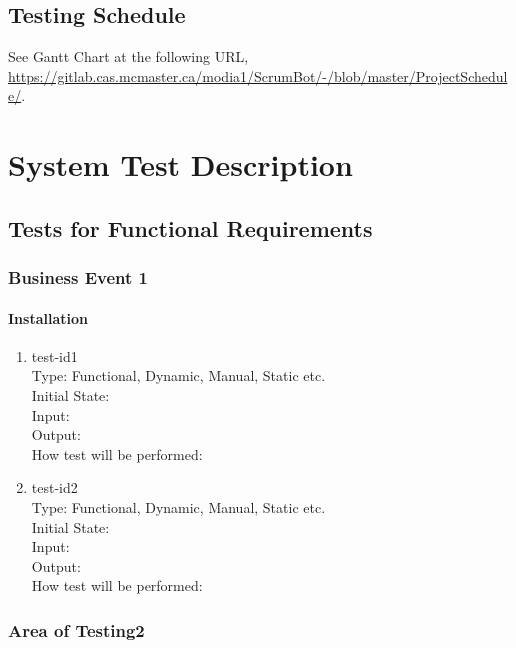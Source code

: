 \documentclass[12pt, titlepage]{article}
\begin{document}
\subsection{Testing Schedule}
See Gantt Chart at the following URL, \url{https://gitlab.cas.mcmaster.ca/modia1/ScrumBot/-/blob/master/ProjectSchedule/}.

\section{System Test Description}
\subsection{Tests for Functional Requirements}

\subsubsection{Business Event 1}
        
\paragraph{Installation}

\begin{enumerate}

\item{test-id1}\\
Type: Functional, Dynamic, Manual, Static etc.\\
Initial State: \\
Input: \\
Output: \\
How test will be performed: \\

\item{test-id2}\\
Type: Functional, Dynamic, Manual, Static etc.\\
Initial State: \\
Input: \\
Output: \\
How test will be performed: \\

\end{enumerate}

\subsubsection{Area of Testing2}
\end{document}
